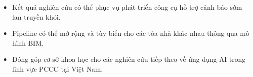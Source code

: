 \begin{itemize}
  \item Kết quả nghiên cứu có thể phục vụ phát triển công cụ hỗ trợ cảnh báo sớm lan truyền khói.
  \item Pipeline có thể mở rộng và tùy biến cho các tòa nhà khác nhau thông qua mô hình BIM.
  \item Đóng góp cơ sở khoa học cho các nghiên cứu tiếp theo về ứng dụng AI trong lĩnh vực PCCC tại Việt Nam.
\end{itemize}


